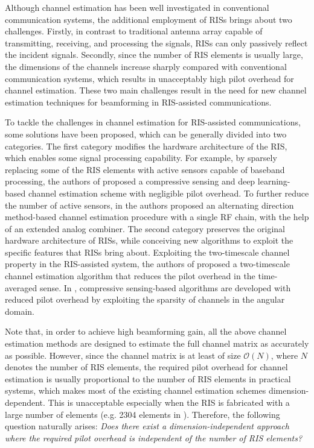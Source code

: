 \documentclass[conference,10pt,twocolumn]{IEEEtran}
\theoremstyle{nonumberplain}
\begin{document}
Although channel estimation has been well investigated in conventional communication systems, the additional employment of RISs brings about two challenges.
Firstly, in contrast to traditional antenna array capable of transmitting, receiving, and processing the signals, RISs can only passively reflect the incident signals.
Secondly, since the number of RIS elements is usually large, the dimensions of the channels increase sharply compared with conventional communication systems, which results in unacceptably high pilot overhead for channel estimation.
These two main challenges result in the need for new channel estimation techniques for beamforming in RIS-assisted communications.

To tackle the challenges in channel estimation for RIS-assisted communications, some solutions have been proposed, which can be generally divided into two categories.
The first category modifies the hardware architecture of the RIS, which enables some signal processing capability.
For example, by sparsely replacing some of the RIS elements with active sensors capable of baseband processing, the authors of \cite{taha2021enabling} proposed a compressive sensing and deep learning-based channel estimation scheme with negligible pilot overhead. 
To further reduce the number of active sensors, in \cite{alexandropoulos2020hardware} the authors proposed an alternating direction method-based channel estimation procedure with a single \ac{RF} chain, with the help of an extended analog combiner.
The second category preserves the original hardware architecture of RISs, while conceiving new algorithms to exploit the specific features that RISs bring about.
Exploiting the two-timescale channel property in the RIS-assisted system, the authors of \cite{Huchen} proposed a two-timescale channel estimation algorithm that reduces the pilot overhead in the time-averaged sense.
In \cite{wang2020compressed}, compressive sensing-based algorithms are developed with reduced pilot overhead by exploiting the sparsity of channels in the angular domain.

Note that, in order to achieve high beamforming gain, all the above channel estimation methods are designed to estimate the full channel matrix as accurately as possible. 
However, since the channel matrix is at least of size $\mathcal{O}(N)$, where $N$ denotes the number of RIS elements, the required pilot overhead for channel estimation is usually proportional to the number of RIS elements \cite{taha2021enabling,alexandropoulos2020hardware,vlachos2019wideband,nguyen2021hybrid,Huchen,wang2020compressed,wang2020channel,kundu2021channel} in practical systems, which makes most of the existing channel estimation schemes dimension-dependent. 
This is unacceptable especially when the RIS is fabricated with a large number of elements (e.g. 2304 elements in \cite{yangfan2020coding}). 
Therefore, the following question naturally arises: {\it Does there exist a dimension-independent approach where the required pilot overhead is independent of the number of RIS elements?}
\end{document}
